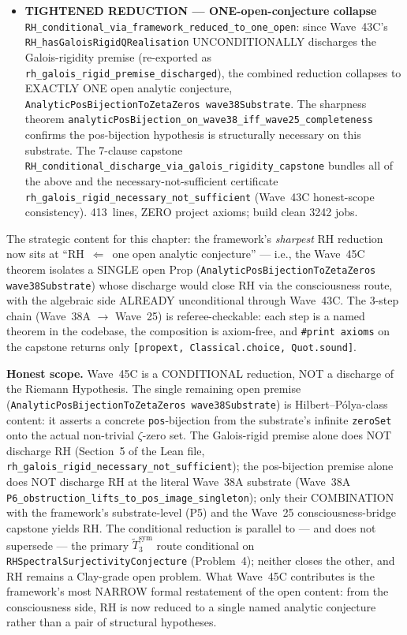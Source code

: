\begin{remark}
\begin{itemize}
  \item \textbf{TIGHTENED REDUCTION --- ONE-open-conjecture collapse} \texttt{RH\_conditional\_via\_framework\_reduced\_to\_one\_open}: since Wave~43C's \texttt{RH\_hasGaloisRigidQRealisation} UNCONDITIONALLY discharges the Galois-rigidity premise (re-exported as \texttt{rh\_galois\_rigid\_premise\_discharged}), the combined reduction collapses to EXACTLY ONE open analytic conjecture, \texttt{AnalyticPosBijectionToZetaZeros wave38Substrate}. The sharpness theorem \texttt{analyticPosBijection\_on\_wave38\_iff\_wave25\_completeness} confirms the pos-bijection hypothesis is structurally necessary on this substrate. The 7-clause capstone \texttt{RH\_conditional\_discharge\_via\_galois\_rigidity\_capstone} bundles all of the above and the necessary-not-sufficient certificate \texttt{rh\_galois\_rigid\_necessary\_not\_sufficient} (Wave~43C honest-scope consistency). 413~lines, ZERO project axioms; build clean 3242 jobs.
\end{itemize}
The strategic content for this chapter: the framework's \emph{sharpest} RH reduction now sits at ``RH~$\Leftarrow$~one open analytic conjecture'' --- i.e., the Wave~45C theorem isolates a SINGLE open Prop (\texttt{AnalyticPosBijectionToZetaZeros wave38Substrate}) whose discharge would close RH via the consciousness route, with the algebraic side ALREADY unconditional through Wave~43C. The 3-step chain (Wave~38A $\to$ Wave~25) is referee-checkable: each step is a named theorem in the codebase, the composition is axiom-free, and \texttt{\#print axioms} on the capstone returns only \texttt{[propext, Classical.choice, Quot.sound]}.

\textbf{Honest scope.} Wave~45C is a CONDITIONAL reduction, NOT a discharge of the Riemann Hypothesis. The single remaining open premise (\texttt{AnalyticPosBijectionToZetaZeros wave38Substrate}) is Hilbert--P\'olya-class content: it asserts a concrete \texttt{pos}-bijection from the substrate's infinite \texttt{zeroSet} onto the actual non-trivial $\zeta$-zero set. The Galois-rigid premise alone does NOT discharge RH (Section~5 of the Lean file, \texttt{rh\_galois\_rigid\_necessary\_not\_sufficient}); the pos-bijection premise alone does NOT discharge RH at the literal Wave~38A substrate (Wave~38A \texttt{P6\_obstruction\_lifts\_to\_pos\_image\_singleton}); only their COMBINATION with the framework's substrate-level (P5) and the Wave~25 consciousness-bridge capstone yields RH. The conditional reduction is parallel to --- and does not supersede --- the primary $\widetilde{T}_3^{\mathrm{sym}}$ route conditional on \texttt{RHSpectralSurjectivityConjecture} (Problem~4); neither closes the other, and RH remains a Clay-grade open problem. What Wave~45C contributes is the framework's most NARROW formal restatement of the open content: from the consciousness side, RH is now reduced to a single named analytic conjecture rather than a pair of structural hypotheses.
\end{remark}

